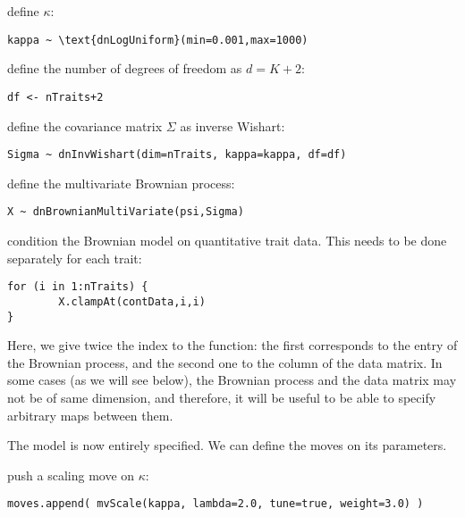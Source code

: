 define $\kappa$:
{\tt \small \begin{snugshade*}
\begin{lstlisting}
kappa ~ \text{dnLogUniform}(min=0.001,max=1000)
\end{lstlisting}
\end{snugshade*}}
define the number of degrees of freedom as $d = K+2$:
{\tt \small \begin{snugshade*}
\begin{lstlisting}
df <- nTraits+2
\end{lstlisting}
\end{snugshade*}}
define the covariance matrix $\Sigma$ as inverse Wishart:
{\tt \small \begin{snugshade*}
\begin{lstlisting}
Sigma ~ dnInvWishart(dim=nTraits, kappa=kappa, df=df)
\end{lstlisting}
\end{snugshade*}}
define the multivariate Brownian process:
{\tt \small \begin{snugshade*}
\begin{lstlisting}
X ~ dnBrownianMultiVariate(psi,Sigma)
\end{lstlisting}
\end{snugshade*}}
condition the Brownian model on quantitative trait data.
This needs to be done separately for each trait:
{\tt \small \begin{snugshade*}
\begin{lstlisting}
for (i in 1:nTraits) {
        X.clampAt(contData,i,i)
}
\end{lstlisting}
\end{snugshade*}}
Here, we give twice the index  to the  function: the first corresponds to the entry of the Brownian process, and the second one to the column of the data matrix. In some cases (as we will see below), the Brownian process and the data matrix may not be of same dimension, and therefore, it will be useful to be able to specify arbitrary maps between them.


The model is now entirely specified. We can define the moves on its parameters.

push a scaling move on $\kappa$:
{\tt \small \begin{snugshade*}
\begin{lstlisting}
moves.append( mvScale(kappa, lambda=2.0, tune=true, weight=3.0) )
\end{lstlisting}
\end{snugshade*}}

